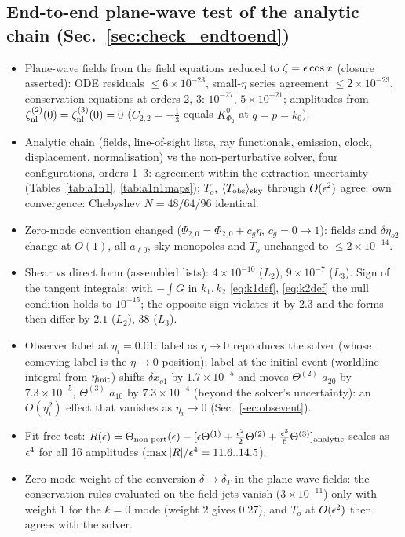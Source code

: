 \subsection*{End-to-end plane-wave test of the analytic chain (Sec.~\ref{sec:check_endtoend})}
\begin{itemize}\itemsep1pt
\item[PW-1] Plane-wave fields from the field equations reduced to $\zeta=\epsilon\cos x$ (closure asserted): ODE residuals $\le6\times10^{-23}$, small-$\eta$ series agreement $\le2\times10^{-23}$, conservation equations at orders 2, 3: $10^{-27}$, $5\times10^{-21}$; amplitudes from $\zeta^{(2)}_{\rm nl}(0)=\zeta^{(3)}_{\rm nl}(0)=0$ ($C_{2,2}=-\tfrac13$ equals $K^0_{\Phi_2}$ at $q=p=k_0$).
\item[PW-2] Analytic chain (fields, line-of-sight lists, ray functionals, emission, clock, displacement, normalisation) vs the non-perturbative solver, four configurations, orders 1--3: agreement within the extraction uncertainty (Tables~\ref{tab:a1n1}, \ref{tab:a1n1maps}); $T_o$, $\langle T_{\rm obs}\rangle_{\rm sky}$ through $O(\epsilon^2)$ agree; own convergence: Chebyshev $N=48/64/96$ identical.
\item[PW-3] Zero-mode convention changed ($\Psi_{2,0}=\Phi_{2,0}+c_g\eta$, $c_g=0\to1$): fields and $\delta\eta_{o2}$ change at $O(1)$, all $a_{\ell0}$, sky monopoles and $T_o$ unchanged to $\le2\times10^{-14}$.
\item[PW-4] Shear vs direct form (assembled lists): $4\times10^{-10}$ ($L_2$), $9\times10^{-7}$ ($L_3$).  Sign of the tangent integrals: with $-\int G$ in $k_1,k_2$ \eqref{eq:k1def}, \eqref{eq:k2def} the null condition holds to $10^{-15}$; the opposite sign violates it by $2.3$ and the forms then differ by $2.1$ ($L_2$), $38$ ($L_3$).
\item[PW-5] Observer label at $\eta_i=0.01$: label as $\eta\to0$ reproduces the solver (whose comoving label is the $\eta\to0$ position); label at the initial event (worldline integral from $\eta_{\rm init}$) shifts $\delta x_{o1}$ by $1.7\times10^{-5}$ and moves $\Theta^{(2)}$ $a_{20}$ by $7.3\times10^{-5}$, $\Theta^{(3)}$ $a_{10}$ by $7.3\times10^{-4}$ (beyond the solver's uncertainty): an $O(\eta_i^2)$ effect that vanishes as $\eta_i\to0$ (Sec.~\ref{sec:obsevent}).
\item[PW-6] Fit-free test: $R(\epsilon)=\Theta_{\rm non\text{-}pert}(\epsilon)-[\epsilon\Theta^{(1)}+\tfrac{\epsilon^2}2\Theta^{(2)}+\tfrac{\epsilon^3}6\Theta^{(3)}]_{\rm analytic}$ scales as $\epsilon^4$ for all 16 amplitudes ($\max|R|/\epsilon^4=11.6..14.5$).
\item[PW-7] Zero-mode weight of the conversion $\delta\to\delta_T$ in the plane-wave fields: the conservation rules evaluated on the field jets vanish ($3\times10^{-11}$) only with weight 1 for the $k=0$ mode (weight 2 gives $0.27$), and $T_o$ at $O(\epsilon^2)$ then agrees with the solver.
\end{itemize}

